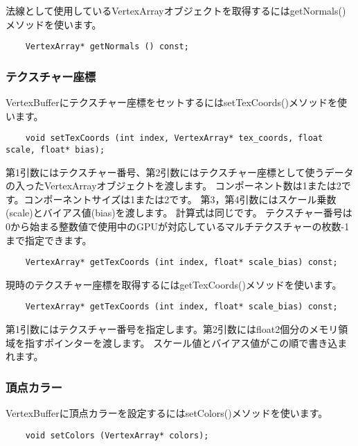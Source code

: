 法線として使用しているVertexArrayオブジェクトを取得するにはgetNormals()メソッドを使います。

\begin{verbatim}
    VertexArray* getNormals () const;
\end{verbatim}


\subsubsection{テクスチャー座標}

VertexBufferにテクスチャー座標をセットするにはsetTexCoords()メソッドを使います。

\begin{verbatim}
    void setTexCoords (int index, VertexArray* tex_coords, float scale, float* bias);
\end{verbatim}

第1引数にはテクスチャー番号、第2引数にはテクスチャー座標として使うデータの入ったVertexArrayオブジェクトを渡します。
コンポーネント数は1または2です。コンポーネントサイズは1または2です。
第3，第4引数にはスケール乗数(scale)とバイアス値(bias)を渡します。
計算式は同じです。
テクスチャー番号は0から始まる整数値で使用中のGPUが対応しているマルチテクスチャーの枚数-1まで指定できます。

\begin{verbatim}
    VertexArray* getTexCoords (int index, float* scale_bias) const;
\end{verbatim}

現時のテクスチャー座標を取得するにはgetTexCoords()メソッドを使います。

\begin{verbatim}
    VertexArray* getTexCoords (int index, float* scale_bias) const;
\end{verbatim}

第1引数にはテクスチャー番号を指定します。第2引数にはfloat2個分のメモリ領域を指すポインターを渡します。
スケール値とバイアス値がこの順で書き込まれます。


\subsubsection{頂点カラー}

VertexBufferに頂点カラーを設定するにはsetColors()メソッドを使います。

\begin{verbatim}
    void setColors (VertexArray* colors);
\end{verbatim}

